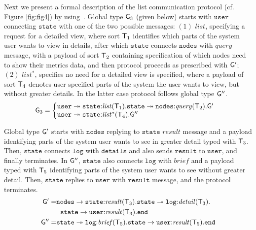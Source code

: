 Next we present a formal description of the list communication protocol (cf. Figure \ref{fig:fig4}) by using~\cite{HuY17}.
Global type ${\sf G}_3$ (given below) starts with $\mathtt{user}$ connecting $\mathtt{state}$ with one of the two possible messages: 
$(1)$ $\mathit{list}$, specifying a request for a detailed view, where sort ${\mathsf T}_1$ identifies which parts of the system user wants to view in details, after which $\mathtt{state}$ connects $\mathtt{nodes}$ with $\mathit{query}$ message, with a payload of sort ${\mathsf T}_2$  containing specification of which nodes need to show their metrics data, and then protocol proceeds as prescribed with ${\sf G}'$; 
$(2)$ $\mathit{list^*}$, specifies no need for a detailed view is specified, where a payload of sort ${\mathsf T}_4$ denotes user specified parts of the system the user wants to view, but without greater details. In the latter case protocol follows global type ${\sf G}''$.
\begin{align*}
\G_3 &= 
\left\{
\begin{array}{@{}l@{}}  
\mathtt{user} \twoheadrightarrow \mathtt{state}{:}\mathit{list}(\T_1).\mathtt{state}\twoheadrightarrow\mathtt{nodes}{:}\mathit{query}(\T_2). \G' \\
\mathtt{user} \twoheadrightarrow \mathtt{state}{:}\mathit{list^*}(\T_4).\G''
\end{array} \right.
\end{align*}

Global type ${\sf G}'$ starts with $\mathtt{nodes}$ replying to $\mathtt{state}$ $\mathit{result}$ message and a payload identifying parts of the system user wants to see in greater detail typed with ${\mathsf T}_3$. Then, $\mathtt{state}$ connects $\mathtt{log}$ with $\mathtt{details}$ and also sends $\mathtt{result}$ to $\mathtt{user}$, and finally terminates. 
In ${\sf G}''$, $\mathtt{state}$ also connects $\mathtt{log}$ with $\mathit{brief}$ and a payload typed with ${\mathsf T}_5$ identifying parts of the system user wants to see without greater detail. Then, $\mathtt{state}$ replies to $\mathtt{user}$ with $\mathtt{result}$ message, and the protocol terminates.
\begin{align*}
{\sf G}' =  & 
\mathtt{nodes}\to\mathtt{state}{:}\mathit{result}({\mathsf T}_3).\mathtt{state}\twoheadrightarrow \mathtt{log}{:}\mathit{detail}({\mathsf T}_3). \\
& \hspace{2mm}
\mathtt{state}\to\mathtt{user}{:}\mathit{result}({\mathsf T}_3).\mathtt{end}\\
{\sf G}'' = &
\mathtt{state}\twoheadrightarrow \mathtt{log}{:}\mathit{brief}({\mathsf T}_5).\mathtt{state}\to\mathtt{user}{:}\mathit{result}({\mathsf T}_5).\mathtt{end}
\end{align*}


